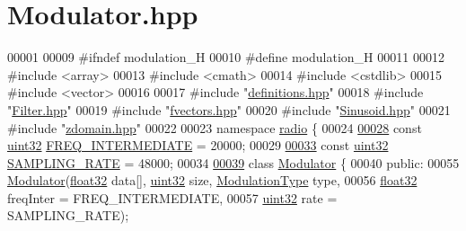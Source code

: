 \hypertarget{Modulator_8hpp_source}{\section{Modulator.\+hpp}
\label{Modulator_8hpp_source}
}

\begin{DoxyCode}
00001 
00009 \textcolor{preprocessor}{#ifndef modulation\_H}
00010 \textcolor{preprocessor}{#define modulation\_H}
00011 
00012 \textcolor{preprocessor}{#include <array>}
00013 \textcolor{preprocessor}{#include <cmath>}
00014 \textcolor{preprocessor}{#include <cstdlib>}
00015 \textcolor{preprocessor}{#include <vector>}
00016 
00017 \textcolor{preprocessor}{#include "\hyperlink{definitions_8hpp}{definitions.hpp}"}
00018 \textcolor{preprocessor}{#include "\hyperlink{Filter_8hpp}{Filter.hpp}"}
00019 \textcolor{preprocessor}{#include "\hyperlink{fvectors_8hpp}{fvectors.hpp}"}
00020 \textcolor{preprocessor}{#include "\hyperlink{Sinusoid_8hpp}{Sinusoid.hpp}"}
00021 \textcolor{preprocessor}{#include "\hyperlink{zdomain_8hpp}{zdomain.hpp}"}
00022 
00023 \textcolor{keyword}{namespace }\hyperlink{namespaceradio}{radio} \{
00024 
\hypertarget{Modulator_8hpp_source_l00028}{}\hyperlink{namespaceradio_aa82ddc6ba206798fd70ffc25665b3cb6}{00028}     \textcolor{keyword}{const} \hyperlink{definitions_8hpp_a1134b580f8da4de94ca6b1de4d37975e}{uint32} \hyperlink{namespaceradio_aa82ddc6ba206798fd70ffc25665b3cb6}{FREQ\_INTERMEDIATE} = 20000;
00029 
\hypertarget{Modulator_8hpp_source_l00033}{}\hyperlink{namespaceradio_a284213fea4beed2f74bb936927cbe654}{00033}     \textcolor{keyword}{const} \hyperlink{definitions_8hpp_a1134b580f8da4de94ca6b1de4d37975e}{uint32} \hyperlink{namespaceradio_a284213fea4beed2f74bb936927cbe654}{SAMPLING\_RATE} = 48000;
00034 
\hypertarget{Modulator_8hpp_source_l00039}{}\hyperlink{classradio_1_1Modulator}{00039}     \textcolor{keyword}{class }\hyperlink{classradio_1_1Modulator}{Modulator} \{
00040         \textcolor{keyword}{public}:
00055             \hyperlink{classradio_1_1Modulator_ab202651b368986cc76673b6e997550b8}{Modulator}(\hyperlink{definitions_8hpp_aacdc525d6f7bddb3ae95d5c311bd06a1}{float32} data[], \hyperlink{definitions_8hpp_a1134b580f8da4de94ca6b1de4d37975e}{uint32} size, 
      \hyperlink{namespaceradio_a46fb7299001138f28b7f69975c58399e}{ModulationType} type,
00056                     \hyperlink{definitions_8hpp_aacdc525d6f7bddb3ae95d5c311bd06a1}{float32} freqInter = FREQ\_INTERMEDIATE,
00057                     \hyperlink{definitions_8hpp_a1134b580f8da4de94ca6b1de4d37975e}{uint32} rate = SAMPLING\_RATE);

\end{DoxyCode}
